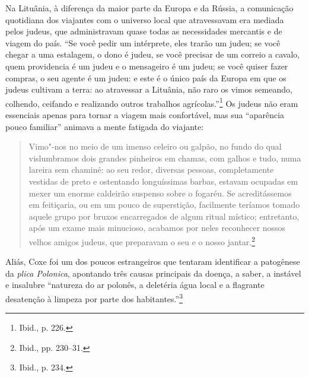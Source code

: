 %

Na Lituânia, à diferença da maior parte da Europa e da Rússia, a
comunicação quotidiana dos viajantes com o universo local que
atravessavam era mediada pelos judeus, que administravam quase todas as
necessidades mercantis e de viagem do país. ``Se você pedir um
intérprete, eles trarão um judeu; se você chegar a uma estalagem, o dono
é judeu, se você precisar de um correio a cavalo, quem providencia é um
judeu e o mensageiro é um judeu; se você quiser fazer compras, o seu
agente é um judeu: e este é o único país da Europa em que os judeus
cultivam a terra: ao atravessar a Lituânia, não raro os vimos semeando,
colhendo, ceifando e realizando outros trabalhos agrícolas.''\footnote{Ibid.,
  p. 226.} Os judeus não eram essenciais apenas para tornar a viagem
mais confortável, mas sua ``aparência pouco familiar'' animava a mente
fatigada do viajante:

\begin{quote}
Vimo"-nos no meio de um imenso celeiro ou galpão, no fundo do qual
vislumbramos dois grandes pinheiros em chamas, com galhos e tudo, numa
lareira sem chaminé: ao seu redor, diversas pessoas, completamente
vestidas de preto e ostentando longuíssimas barbas, estavam ocupadas em
mexer um enorme caldeirão suspenso sobre o fogaréu. Se acreditássemos em
feitiçaria, ou em um pouco de superstição, facilmente teríamos tomado
aquele grupo por bruxos encarregados de algum ritual místico;
entretanto, após um exame mais minucioso, acabamos por neles reconhecer
nossos velhos amigos judeus, que preparavam o seu e o nosso
jantar.\footnote{Ibid., pp. 230--31.}
\end{quote}

\asterisc

Aliás, Coxe foi um dos poucos estrangeiros que tentaram identificar a
patogênese da \emph{plica Polonica}, apontando três causas principais da
doença, a saber, a instável e insalubre ``natureza do ar polonês, a
deletéria água local e a flagrante desatenção à limpeza por parte dos
habitantes.''\footnote{Ibid., p. 234.}


